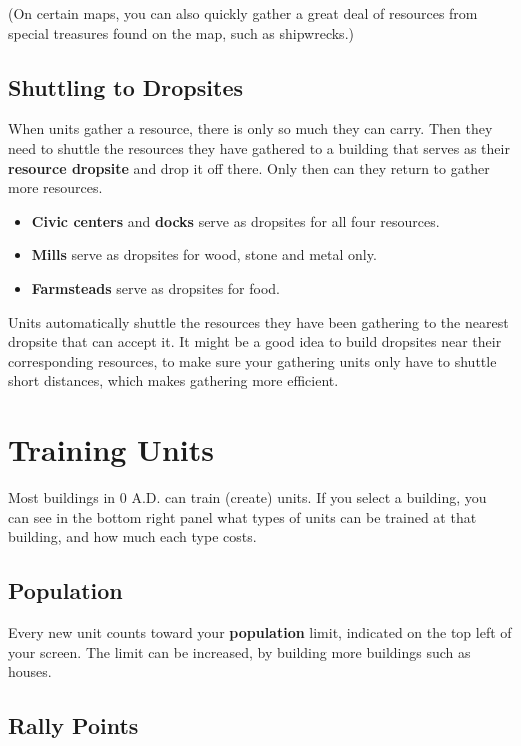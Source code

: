\documentclass[a4paper,titlepage]{article}
\begin{document}
(On certain maps, you can also quickly gather a great deal of resources from special treasures found on the map, such as shipwrecks.)

\subsection*{Shuttling to Dropsites}

When units gather a resource, there is only so much they can carry. Then they need to shuttle the resources they have gathered to a building that serves as their \textbf{resource dropsite} and drop it off there. Only then can they return to gather more resources.

\begin{itemize}
\item \textbf{Civic centers} and \textbf{docks} serve as dropsites for all four resources.
\item \textbf{Mills} serve as dropsites for wood, stone and metal only.
\item \textbf{Farmsteads} serve as dropsites for food.
\end{itemize}

Units automatically shuttle the resources they have been gathering to the nearest dropsite that can accept it. It might be a good idea to build dropsites near their corresponding resources, to make sure your gathering units only have to shuttle short distances, which makes gathering more efficient.

\clearpage

\section{Training Units}

Most buildings in 0 A.D. can train (create) units. If you select a building, you can see in the bottom right panel what types of units can be trained at that building, and how much each type costs.

\subsection*{Population}

Every new unit counts toward your \textbf{population} limit, indicated on the top left of your screen. The limit can be increased, by building more buildings such as houses.

\subsection*{Rally Points}
\end{document}
